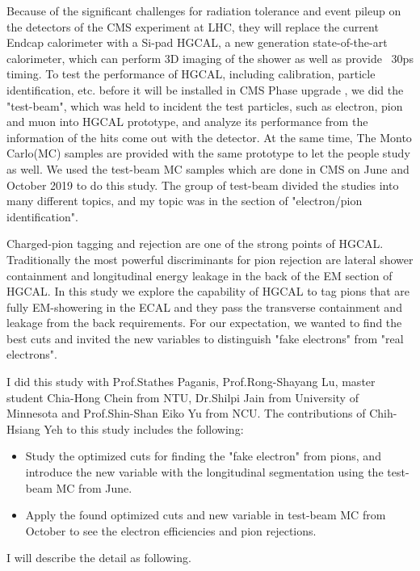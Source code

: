 Because of the significant challenges for radiation tolerance and event pileup on the detectors of the CMS experiment at LHC, they will replace the current Endcap calorimeter with a Si-pad HGCAL, a new generation state-of-the-art calorimeter, which can perform 3D imaging of the shower as well as provide ~30ps timing. To test the performance of HGCAL, including calibration, particle identification, etc. before it will be installed in CMS Phase  upgrade , we did the "test-beam", which was held to incident the test particles, such as electron, pion and muon into HGCAL prototype, and analyze its performance from the information of the hits come out with the detector. At the same time,  The Monto Carlo(MC) samples are provided with the same prototype to let the people study as well.  We used the test-beam MC samples which are done in CMS on June and October 2019 to do this study. The group of test-beam divided the studies into many different topics, and my topic was in the section of "electron/pion identification".

Charged-pion tagging and rejection are one of the strong points of HGCAL. Traditionally the most powerful discriminants for pion rejection are lateral shower containment and longitudinal energy leakage in the back of the EM section of HGCAL. In this study we explore the capability of HGCAL to tag pions that are fully EM-showering in the ECAL and they pass the transverse containment and leakage from the back requirements. For our expectation, we wanted to find the best cuts and invited the new variables to distinguish "fake electrons" from "real electrons".

I did this study with Prof.Stathes Paganis, Prof.Rong-Shayang Lu, master student Chia-Hong Chein from NTU, Dr.Shilpi Jain from University of Minnesota and Prof.Shin-Shan Eiko Yu from NCU.  The contributions of Chih-Hsiang Yeh to this study includes the following:
\begin{itemize}
\item Study the optimized cuts for finding the "fake electron" from pions, and introduce the new variable with the longitudinal segmentation using the test-beam MC from June.
\item Apply the found optimized cuts and new variable in test-beam MC from October to see the electron efficiencies and pion rejections.
\end{itemize}
I will describe the detail as following.

